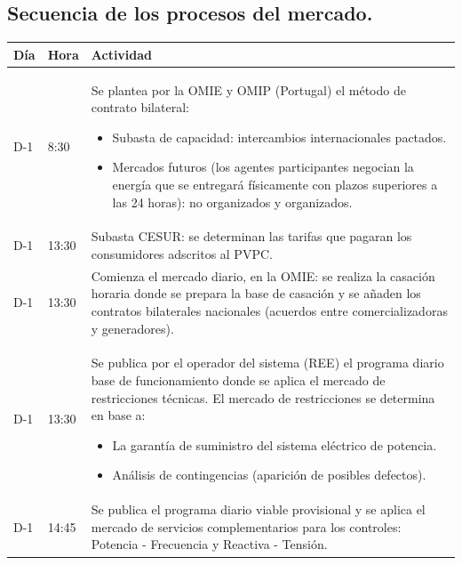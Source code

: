 \subsection{Secuencia de los procesos del mercado.}
\begin{table}[H]
	\centering
	\renewcommand{\arraystretch}{1.5}
	\begin{tabular}{p{2cm}|p{2cm}|p{8cm}}
		\hline
		Día & Hora & Actividad \\
		\hline
		D-1 & 8:30 & Se plantea por la OMIE y OMIP (Portugal) el método de contrato bilateral:
		\begin{itemize}
			\item Subasta de capacidad: intercambios internacionales pactados.
			\item Mercados futuros (los agentes participantes negocian la energía que se entregará físicamente con plazos superiores a las 24 horas): no organizados y organizados.
		\end{itemize} \\\hline
		D-1 & 13:30& Subasta CESUR: se determinan las tarifas que pagaran los consumidores adscritos al PVPC.  \\\hline
		D-1 & 13:30 & Comienza el mercado diario, en la OMIE: se realiza la casación horaria donde se prepara la base de casación y se añaden los contratos bilaterales nacionales (acuerdos entre comercializadoras y generadores). \\\hline
		D-1 & 13:30 &  Se publica por el operador del sistema (REE) el programa diario base de funcionamiento donde se aplica el mercado de restricciones técnicas. El mercado de restricciones se determina en base a:
		\begin{itemize}
			\item La garantía de suministro del sistema eléctrico de potencia.
			\item Análisis de contingencias (aparición de posibles defectos).
		\end{itemize}\\\hline
		D-1 & 14:45 & Se publica el programa diario viable provisional y se aplica el mercado de servicios complementarios para los controles: Potencia - Frecuencia y Reactiva - Tensión. 
		

\end{tabular}
\end{table}
